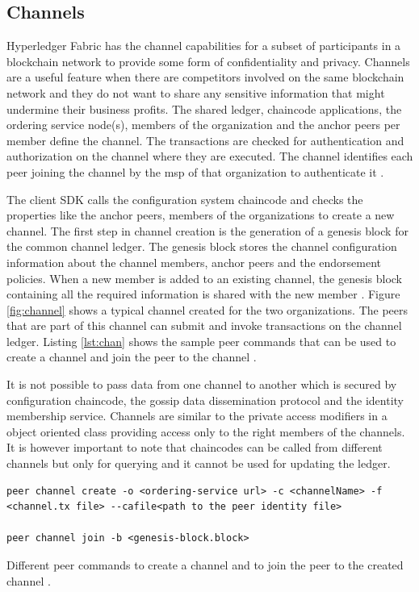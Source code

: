 \documentclass[
  a4paper,  %
  twoside,  %
  bibliography=totoc,
  headsepline,
  cleardoublepage=empty,
  parskip=half,
  draft=false
]{scrbook}
\begin{document}
\subsection{Channels}
Hyperledger Fabric has the channel capabilities for a subset of participants in a blockchain network to provide some form of confidentiality and privacy. Channels are a useful feature when there are competitors involved on the same blockchain network and they do not want to share any sensitive information that might undermine their business profits. The shared ledger, chaincode applications, the ordering service node(s), members of the organization and the anchor peers per member define the channel. The transactions are checked for authentication and authorization on the channel where they are executed. The channel identifies each peer joining the channel by the \gls{msp} of that organization to authenticate it \cite{Channels}.

The client SDK calls the configuration system chaincode and checks the properties like the anchor peers, members of the organizations to create a new channel. The first step in channel creation is the generation of a genesis block for the common channel ledger. The genesis block stores the channel configuration information about the channel members, anchor peers and the endorsement policies. When a new member is added to an existing channel, the genesis block containing all the required information is shared with the new member \cite{Channels}. Figure \ref{fig:channel} shows a typical channel created for the two organizations. The peers that are part of this channel can submit and invoke transactions on the channel ledger. Listing \ref{lst:chan} shows the sample peer commands that can be used to create a channel and join the peer to the channel \cite{Channels}.

It is not possible to pass data from one channel to another which is secured by configuration chaincode, the gossip data dissemination protocol and the identity membership service. Channels are similar to the private access modifiers in a object oriented class providing access only to the right members of the channels. It is however important to note that chaincodes can be called from different channels but only for querying and it cannot be used for updating the ledger.
\begin{Listing}
  \begin{lstlisting}
peer channel create -o <ordering-service url> -c <channelName> -f <channel.tx file> --cafile<path to the peer identity file>
    
peer channel join -b <genesis-block.block>
\end{lstlisting}
  \caption{Different peer commands to create a channel and to join the peer to the created channel \cite{Channels}.}
  \label{lst:chan}
\end{Listing}
\end{document}
